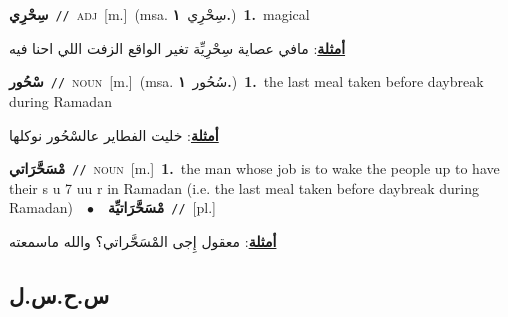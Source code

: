 \documentclass[10pt,a4paper,twoside]{article} %
\begin{document}
\begin{multicols}{2}
{\setlength\topsep{0pt}\textbf{\foreignlanguage{arabic}{سِحْرِي}}\ {\color{gray}\texttt{//}\color{black}}\ \textsc{adj}\ [m.]\ \color{gray}(msa. \foreignlanguage{arabic}{سِحْرِي}~\foreignlanguage{arabic}{\textbf{١.}})\color{black}\ \textbf{1.}~magical\  \begin{flushright}\color{gray}\foreignlanguage{arabic}{\textbf{\underline{\foreignlanguage{arabic}{أمثلة}}}: مافي عصاية سِحْرِيِّة تغير الواقع الزفت اللي احنا فيه}\end{flushright}\color{black}} \vspace{2mm}

{\setlength\topsep{0pt}\textbf{\foreignlanguage{arabic}{سْحُور}}\ {\color{gray}\texttt{//}\color{black}}\ \textsc{noun}\ [m.]\ \color{gray}(msa. \foreignlanguage{arabic}{سُحُور}~\foreignlanguage{arabic}{\textbf{١.}})\color{black}\ \textbf{1.}~the last meal taken before daybreak during Ramadan\  \begin{flushright}\color{gray}\foreignlanguage{arabic}{\textbf{\underline{\foreignlanguage{arabic}{أمثلة}}}: خليت الفطاير عالسْحُور نوكلها}\end{flushright}\color{black}} \vspace{2mm}

{\setlength\topsep{0pt}\textbf{\foreignlanguage{arabic}{مْسَحَّرَاتي}}\ {\color{gray}\texttt{//}\color{black}}\ \textsc{noun}\ [m.]\ \textbf{1.}~the man whose job is to wake the people up to have their s u 7 uu r in Ramadan (i.e. the last meal taken before daybreak during Ramadan)\ \ $\bullet$\ \ \setlength\topsep{0pt}\textbf{\foreignlanguage{arabic}{مْسَحَّرَاتيِّة}}\ {\color{gray}\texttt{//}\color{black}}\ [pl.]\  \begin{flushright}\color{gray}\foreignlanguage{arabic}{\textbf{\underline{\foreignlanguage{arabic}{أمثلة}}}: معقول إِجى المْسَحَّراتي؟ والله ماسمعته}\end{flushright}\color{black}} \vspace{2mm}

\vspace{-3mm}
\subsection*{\color{blue}\foreignlanguage{arabic}{س.ح.س.ل}\color{blue}{}} 


\end{multicols}
\end{document}
